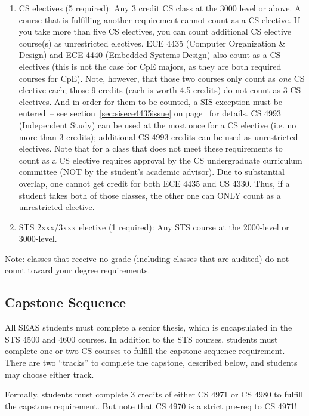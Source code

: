 \documentclass[10pt,letter]{book}
\begin{document}
\begin{enumerate}
\item CS electives (5 required): Any 3 credit CS class at the 3000
  level or above. A course that is fulfilling another requirement
  cannot count as a CS elective. If you take more than five CS
  electives, you can count additional CS elective course(s) as
  unrestricted electives. ECE 4435 (Computer Organization \&
  Design) and ECE 4440 (Embedded Systems Design) also count as a
  CS electives (this is not the case for CpE majors, as they are both
  required courses for CpE). Note, however, that those two courses
  only count as {\em one} CS elective each; those 9 credits (each is
  worth 4.5 credits) do not count as 3 CS electives.  And in order for
  them to be counted, a SIS exception must be entered~-- see
  section~\ref{sec:sisece4435issue} on
  page~\pageref{sec:sisece4435issue} for details.  CS 4993
  (Independent Study) can be used at the most once for a CS elective
  (i.e. no more than 3 credits); additional CS 4993 credits can
  be used as unrestricted electives. Note that for a class that does
  not meet these requirements to count as a CS elective requires
  approval by the CS undergraduate curriculum committee (NOT by the
  student's academic advisor). Due to substantial overlap, one cannot
  get credit for both ECE 4435 and CS 4330. Thus, if a
  student takes both of those classes, the other one can ONLY count as
  a unrestricted elective.

\item STS 2xxx/3xxx elective (1 required): Any STS course at the
  2000-level or 3000-level.
\end{enumerate}
 
Note: classes that receive no grade (including classes that are
audited) do not count toward your degree requirements.

\subsection{Capstone Sequence}
\label{capstone-section}

All SEAS students must complete a senior thesis, which is encapsulated
in the STS 4500 and 4600 courses.  In addition to the STS courses,
students must complete one or two CS courses to fulfill the capstone
sequence requirement.  There are two ``tracks'' to complete the
capstone, described below, and students may choose either track.

Formally, students must complete 3 credits of either CS 4971 or CS
4980 to fulfill the capstone requirement.  But note that CS 4970 is a
strict pre-req to CS 4971!
\end{document}
